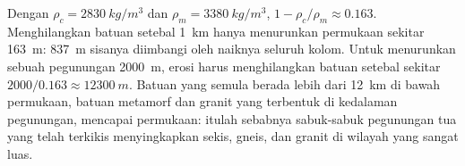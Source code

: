 Dengan $\rho_c = \qty{2830}{kg/m^3}$ dan $\rho_m = \qty{3380}{kg/m^3}$, $1 -
\rho_c/\rho_m \approx 0.163$. Menghilangkan batuan setebal \qty{1}{km} hanya
menurunkan permukaan sekitar \qty{163}{m}: \qty{837}{m} sisanya diimbangi oleh
naiknya seluruh kolom. Untuk menurunkan sebuah pegunungan \qty{2000}{m}, erosi
harus menghilangkan batuan setebal sekitar $2000/0.163 \approx \qty{12300}{m}$.
Batuan yang semula berada lebih dari \qty{12}{km} di bawah permukaan, batuan
metamorf dan granit yang terbentuk di kedalaman pegunungan, mencapai permukaan:
itulah sebabnya sabuk-sabuk pegunungan tua yang telah terkikis menyingkapkan
sekis, gneis, dan granit di wilayah yang sangat luas.

